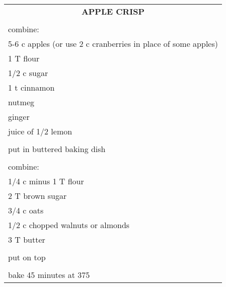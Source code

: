 \documentclass[8pt]{report}
\begin{document}
\begin{tabular}{|l|} \hline	%
 
\multicolumn{1}{|c|}{\textbf{APPLE CRISP}}
\\
\\

\index{desserts!apple crisp} \index{apple crisp}

combine:\\
\hspace{0.5 in}	5-6 c apples (or use 2 c cranberries in place of some apples)\\
\hspace{0.5 in}	1 T flour\\
\hspace{0.5 in}	1/2 c sugar\\
\hspace{0.5 in}	1 t cinnamon\\
\hspace{0.5 in}	nutmeg\\
\hspace{0.5 in}	ginger\\
\hspace{0.5 in}	juice of 1/2 lemon\\
\\
put in buttered baking dish\\
\\
combine:\\
\hspace{0.5 in}	1/4 c minus 1 T flour\\
\hspace{0.5 in}	2 T brown sugar\\
\hspace{0.5 in}	3/4 c oats\\
\hspace{0.5 in}	1/2 c chopped walnuts or almonds\\
\hspace{0.5 in}	3 T butter\\
\\
put on top\\
\\
bake 45 minutes at 375\\


\hline

\end{tabular}
\end{document}
